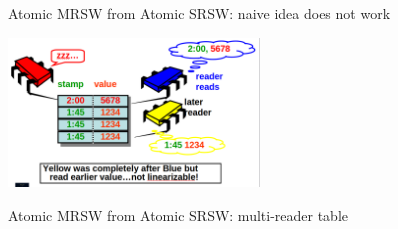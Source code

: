 \begin{frame}[fragile]{Atomic MRSW from Atomic SRSW: naive idea does not work}

\begin{center}
  \includegraphics[width=0.5\textwidth]{./pics/mr-atomic/mr3.png}
\end{center}

\end{frame}


\begin{frame}[fragile]{Atomic MRSW from Atomic SRSW: multi-reader table}



\end{frame}

